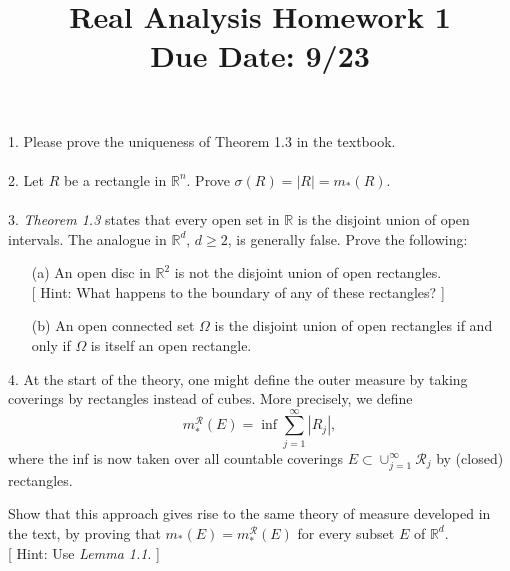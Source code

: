 \documentclass[a4paper,11pt]{article}
\title{Real Analysis Homework 1\\ Due Date: 9/23}
\begin{document}
\maketitle

1. Please prove the uniqueness of Theorem 1.3 in the textbook.\\\\


2. Let $R$ be a rectangle in $\mathbb{R}^n$. Prove $\sigma(R) = |R| = m_*(R)$.\\\\


3. \textit{Theorem 1.3} states that every open set in $\mathbb{R}$ is the disjoint union of open intervals. The analogue in $\mathbb{R}^d$, $d \geq 2$, is generally false. Prove the following:

\begin{enumerate}
	\item [(a)] An open disc in $\mathbb{R}^2$ is not the disjoint union of open rectangles.\\
	{[}
	Hint: What happens to the boundary of any of these rectangles?
	{]}

	\item [(b)] An open connected set $\Omega$ is the disjoint union of open rectangles if and only if $\Omega$ is itself an open rectangle.\\
\end{enumerate}



4. At the start of the theory, one might define the outer measure by taking coverings by rectangles instead of cubes. More precisely, we define
	$$m_*^\mathcal{R}(E) = \inf \sum_{j = 1}^\infty |R_j|,$$
where the inf is now taken over all countable coverings $E \subset \cup_{j = 1}^\infty \mathcal{R}_j$ by (closed) rectangles.

Show that this approach gives rise to the same theory of measure developed in the text, by proving that $m_*(E) = m_*^\mathcal{R}(E)$ for every subset $E$ of $\mathbb{R}^d$.\\
{[}
Hint: Use \textit{Lemma 1.1}.
{]}\\
\end{document}
